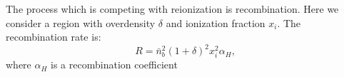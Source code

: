 \label{sec:recomb}


The process which is competing with reionization is recombination. Here we consider a region with overdensity $\delta$ and ionization fraction $x_i$. The recombination rate is:
\begin{equation}
R = \bar{n}_b^2 (1+\delta)^2 x_i^2 \alpha_H,
\end{equation}
where $\alpha_H$ is a recombination coefficient